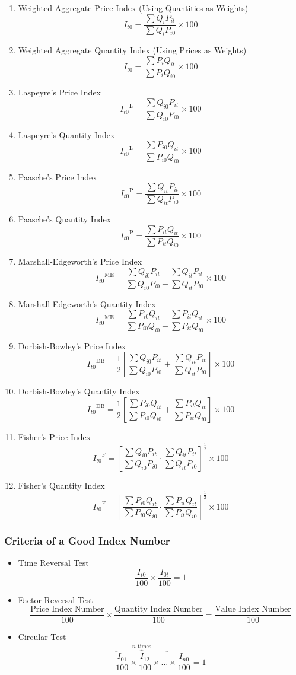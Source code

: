 \documentclass[
10pt, %
a4paper, %
]{report}
\begin{document}
\begin{itemize}
\begin{enumerate}
\item Weighted Aggregate Price Index (Using Quantities as Weights) \[I_{t0} = \frac{\sum Q_i P_{it}}{\sum Q_i P_{i0}} \times 100\]
\item Weighted Aggregate Quantity Index (Using Prices as Weights) \[I_{t0} = \frac{\sum P_i Q_{it}}{\sum P_i Q_{i0}} \times 100\]
\item Laspeyre's Price Index \[{I_{t0}}^\mathrm{L} = \frac{\sum Q_{i0} P_{it}}{\sum Q_{i0} P_{i0}} \times 100\]
\item Laspeyre's Quantity Index \[{I_{t0}}^\mathrm{L} = \frac{\sum P_{i0} Q_{it}}{\sum P_{i0} Q_{i0}} \times 100\]
\item Paasche's Price Index \[{I_{t0}}^\mathrm{P} = \frac{\sum Q_{it} P_{it}}{\sum Q_{it} P_{i0}} \times 100\]
\item Paasche's Quantity Index \[{I_{t0}}^\mathrm{P} = \frac{\sum P_{it} Q_{it}}{\sum P_{it} Q_{i0}} \times 100\]
\item Marshall-Edgeworth's Price Index \[{I_{t0}}^\mathrm{ME} = \frac{\sum Q_{i0} P_{it} + \sum Q_{it} P_{it}}{\sum Q_{i0} P_{i0} + \sum Q_{it} P_{i0}} \times 100\]
\item Marshall-Edgeworth's Quantity Index \[{I_{t0}}^\mathrm{ME} = \frac{\sum P_{i0} Q_{it} + \sum P_{it} Q_{it}}{\sum P_{i0} Q_{i0} + \sum P_{it} Q_{i0}} \times 100\]
\item Dorbish-Bowley's Price Index \[{I_{t0}}^\mathrm{DB} = \frac{1}{2} \left[ \frac{\sum Q_{i0} P_{it}}{\sum Q_{i0} P_{i0}} + \frac{\sum Q_{it} P_{it}}{\sum Q_{it} P_{i0}} \right] \times 100\]
\item Dorbish-Bowley's Quantity Index \[{I_{t0}}^\mathrm{DB} = \frac{1}{2} \left[ \frac{\sum P_{i0} Q_{it}}{\sum P_{i0} Q_{i0}} + \frac{\sum P_{it} Q_{it}}{\sum P_{it} Q_{i0}} \right] \times 100\]\item Fisher's Price Index \[{I_{t0}}^\mathrm{F} = \left[ \frac{\sum Q_{i0} P_{it}}{\sum Q_{i0} P_{i0}} \cdot \frac{\sum Q_{it} P_{it}}{\sum Q_{it} P_{i0}} \right]^\frac{1}{2} \times 100\]
\item Fisher's Quantity Index \[{I_{t0}}^\mathrm{F} = \left[ \frac{\sum P_{i0} Q_{it}}{\sum P_{i0} Q_{i0}} \cdot \frac{\sum P_{it} Q_{it}}{\sum P_{it} Q_{i0}} \right]^\frac{1}{2} \times 100\]
\end{enumerate}
\end{itemize}

\subsubsection*{Criteria of a Good Index Number}
\begin{itemize}
\item Time Reversal Test
\[\frac{I_{t0}}{100} \times \frac{I_{0t}}{100} = 1\]
\item Factor Reversal Test
\[\frac{\text{Price Index Number}}{100} \times \frac{\text{Quantity Index Number}}{100} = \frac{\text{Value Index Number}}{100}\]
\item Circular Test
\[ \overbrace{\frac{I_{01}}{100} \times \frac{I_{12}}{100} \times\dots}^{n \text{ times}} \times \frac{I_{n0}}{100}= 1\]
\end{itemize}
\end{document}
